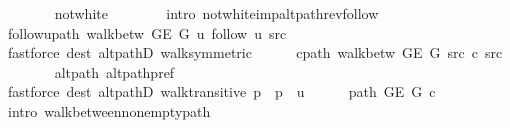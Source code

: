 \begin{isabellebody}
\ \ \ \ \ \ \isamarkupfalse%
\ not{\isacharunderscore}{\kern0pt}white\isanewline
\ \ \ \ \ \ \isamarkupfalse%
\ {\isacharparenleft}{\kern0pt}intro\ not{\isacharunderscore}{\kern0pt}white{\isacharunderscore}{\kern0pt}imp{\isacharunderscore}{\kern0pt}alt{\isacharunderscore}{\kern0pt}path{\isacharunderscore}{\kern0pt}rev{\isacharunderscore}{\kern0pt}follow{\isacharparenright}{\kern0pt}\isanewline
\ \ \ \ \isamarkupfalse%
\ follow{\isacharunderscore}{\kern0pt}u{\isacharunderscore}{\kern0pt}path{\isacharcolon}{\kern0pt}\ {\isachardoublequoteopen}walk{\isacharunderscore}{\kern0pt}betw\ {\isacharparenleft}{\kern0pt}G{\isachardot}{\kern0pt}E\ G{\isacharparenright}{\kern0pt}\ u\ {\isacharparenleft}{\kern0pt}follow\ u{\isacharparenright}{\kern0pt}\ src{\isachardoublequoteclose}\isanewline
\ \ \ \ \ \ \isamarkupfalse%
\ {\isacharparenleft}{\kern0pt}fastforce\ dest{\isacharcolon}{\kern0pt}\ alt{\isacharunderscore}{\kern0pt}pathD{\isacharparenleft}{\kern0pt}{}{\isacharparenright}{\kern0pt}\ walk{\isacharunderscore}{\kern0pt}symmetric{\isacharparenright}{\kern0pt}\isanewline
\ \ \ \ \isamarkupfalse%
\ c{\isacharunderscore}{\kern0pt}path{\isacharcolon}{\kern0pt}\ {\isachardoublequoteopen}walk{\isacharunderscore}{\kern0pt}betw\ {\isacharparenleft}{\kern0pt}G{\isachardot}{\kern0pt}E\ G{\isacharparenright}{\kern0pt}\ src\ {\isacharquery}{\kern0pt}c\ src{\isachardoublequoteclose}\isanewline
\ \ \ \ \ \ \isamarkupfalse%
\ alt{\isacharunderscore}{\kern0pt}path\ alt{\isacharunderscore}{\kern0pt}path{\isacharunderscore}{\kern0pt}pref\isanewline
\ \ \ \ \ \ \isamarkupfalse%
\ {\isacharparenleft}{\kern0pt}fastforce\ dest{\isacharcolon}{\kern0pt}\ alt{\isacharunderscore}{\kern0pt}pathD{\isacharparenleft}{\kern0pt}{}{\isacharparenright}{\kern0pt}\ walk{\isacharunderscore}{\kern0pt}transitive{\isacharbrackleft}{\kern0pt}\ {\isacharquery}{\kern0pt}p\ {\isacharequal}{\kern0pt}\ {\isachardoublequoteopen}p\ {\isacharat}{\kern0pt}\ {\isacharbrackleft}{\kern0pt}u{\isacharbrackright}{\kern0pt}{\isachardoublequoteclose}{\isacharbrackright}{\kern0pt}{\isacharparenright}{\kern0pt}\isanewline
\ \ \ \ \isamarkupfalse%
\ {\isachardoublequoteopen}path\ {\isacharparenleft}{\kern0pt}G{\isachardot}{\kern0pt}E\ G{\isacharparenright}{\kern0pt}\ {\isacharquery}{\kern0pt}c{\isachardoublequoteclose}\isanewline
\ \ \ \ \ \ \isamarkupfalse%
\ {\isacharparenleft}{\kern0pt}intro\ walk{\isacharunderscore}{\kern0pt}between{\isacharunderscore}{\kern0pt}nonempty{\isacharunderscore}{\kern0pt}path{\isacharparenright}{\kern0pt}\isanewline

\end{isabellebody}
